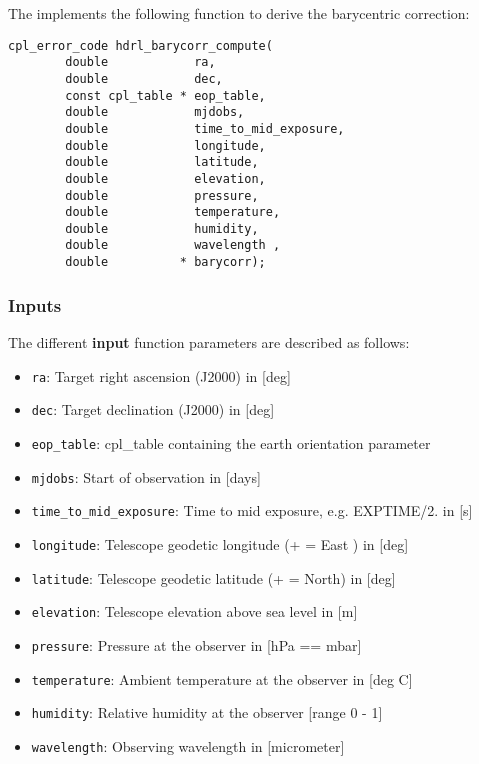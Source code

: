 The \HDRL implements the following function to derive the barycentric correction:
\begin{lstlisting}
cpl_error_code hdrl_barycorr_compute(
        double            ra,
        double            dec,
        const cpl_table * eop_table,
        double            mjdobs,
        double            time_to_mid_exposure,
        double            longitude,
        double            latitude,
        double            elevation,
        double            pressure,
        double            temperature,
        double            humidity,
        double            wavelength ,
        double          * barycorr);
\end{lstlisting}

\subsubsection{Inputs}
\label{sec:algorithms:barycorr:inputs}

The different \textbf{input} function parameters are described as follows:
\begin{itemize}\itemsep-1pt \parskip2pt 
\item \verb+ra+:                     Target right ascension (J2000) in [deg]
\item \verb+dec+:                    Target declination (J2000) in [deg]
\item \verb+eop_table+:              cpl\_table containing the earth orientation parameter
\item \verb+mjdobs+:                 Start of observation in [days]
\item \verb+time_to_mid_exposure+:   Time to mid exposure, e.g. EXPTIME/2. in [s]
\item \verb+longitude+:              Telescope geodetic longitude (+ = East ) in [deg]
\item \verb+latitude+:               Telescope geodetic latitude  (+ = North) in [deg]
\item \verb+elevation+:              Telescope elevation above sea level in [m]
\item \verb+pressure+:               Pressure at the observer in [hPa == mbar]
\item \verb+temperature+:            Ambient temperature at the observer in [deg C]
\item \verb+humidity+:               Relative humidity at the observer [range 0 - 1]
\item \verb+wavelength+:             Observing wavelength in [micrometer]
\end{itemize}


